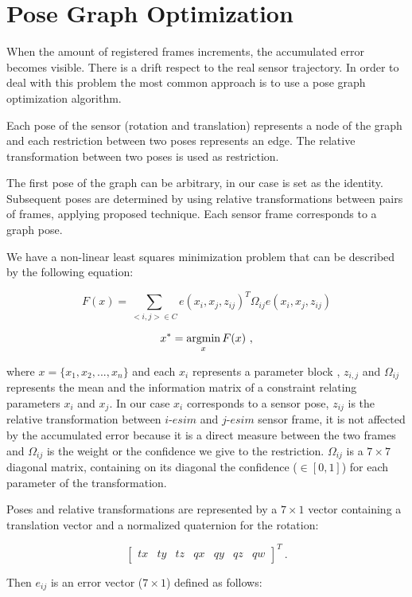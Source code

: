 \section{Pose Graph Optimization}
\label{sec:posegraph}
When the amount of registered frames increments, the accumulated error 
becomes visible. There is a drift respect to the real sensor trajectory. 
In order to deal with this problem the most common approach is to use a pose graph 
optimization algorithm. 


Each pose of the sensor (rotation and translation) represents a node of the 
graph and each restriction between two poses represents an edge. The relative 
transformation between two poses is used as restriction.


The first pose of the graph can be arbitrary, in our case is set as the identity. Subsequent 
poses are determined by using relative transformations between pairs of frames, applying 
proposed technique. Each sensor frame corresponds to a graph pose. 

We have a non-linear least squares minimization problem that can be described by the following equation:

$$ F(x) = \sum\limits_{<i,j> \in C } e(x_i,x_j,z_{ij})^T \Omega_{ij} e(x_i,x_j,z_{ij}) $$

$$ x^* = \mathop{\rm argmin}_x F(x) \ ,$$

\noindent where $x=\{x_1,x_2,...,x_n\}$ and each $x_i$ represents a parameter block , $z_{i,j}$ and $\Omega_{ij}$ represents the mean  
 and the information matrix  of a constraint 
relating parameters $x_i$ and $x_j$. In our case $x_i$ corresponds to a sensor pose, $z_{ij}$ is the 
relative transformation between $i$-$esim$ and $j$-$esim$ sensor frame, it is not affected by the accumulated error 
because it is a direct measure between the two frames and $\Omega_{ij}$ is the weight or 
the confidence we give to the restriction. $\Omega_{ij}$ is a $7\times7$ diagonal matrix, containing on its diagonal the confidence ($\in [0,1]$) for each 
parameter of the transformation. 

Poses and relative transformations are represented by a $7\times1$ vector containing a translation vector
 and a normalized quaternion for the rotation:

$$ \begin{bmatrix} tx & ty & tz & qx & qy & qz & qw \end{bmatrix} ^T \ .$$



Then $e_{ij}$ is an error vector ($7\times1$) defined as follows:

